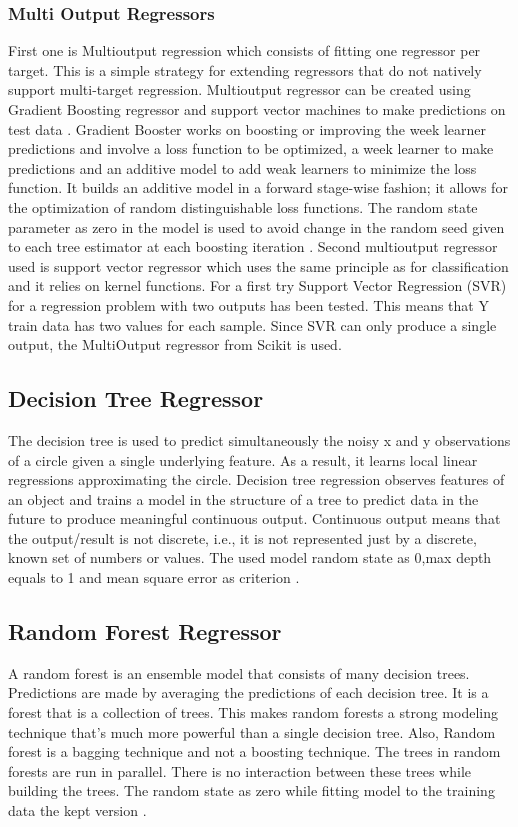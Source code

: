 \subsubsection{Multi Output Regressors}
First one is Multioutput regression which consists of fitting one regressor per target. This is a simple strategy for extending regressors that do not natively support multi-target regression. Multioutput regressor can be created using Gradient Boosting regressor and support vector machines to make predictions on test data \cite{scikit-learn}.\newline
Gradient Booster works on boosting or improving the week learner predictions and involve a loss function to be optimized, a week learner to make predictions and an additive model to add weak learners to minimize the loss function. It builds an additive model in a forward stage-wise fashion; it allows for the optimization of random distinguishable loss functions. The random state parameter as zero in the model is used to avoid change in the random seed given to each tree estimator at each boosting iteration \cite{scikit-learn:GradientBoostingRegressor}.\newline 
Second multioutput regressor used is support vector regressor which uses the same principle as for classification and it relies on kernel functions. For a first try Support Vector Regression (SVR) for a regression problem with two outputs has been tested. This means that Y train data has two values for each sample. Since SVR can only produce a single output, the MultiOutput regressor from Scikit is used.
\subsection{Decision Tree Regressor}
The decision tree is used to predict simultaneously the noisy x and y observations of a circle given a single underlying feature. As a result, it learns local linear regressions approximating the circle. Decision tree regression observes features of an object and trains a model in the structure of a tree to predict data in the future to produce meaningful continuous output. Continuous output means that the output/result is not discrete, i.e., it is not represented just by a discrete, known set of numbers or values. The used model random state as 0,max depth equals to 1 and mean square error as criterion\cite{tensorflow:tutorial} \cite{tensorflow:keras}.\newline
\subsection{Random Forest Regressor}
A random forest is an ensemble model that consists of many decision trees. Predictions are made by averaging the predictions of each decision tree. It is a forest that is a collection of trees. This makes random forests a strong modeling technique that’s much more powerful than a single decision tree. Also, Random forest is a bagging technique and not a boosting technique. The trees in random forests are run in parallel. There is no interaction between these trees while building the trees. The random state as zero while fitting model to the training data the kept version\cite{tensorflow:tutorial} \cite{tensorflow:keras}.\newline

